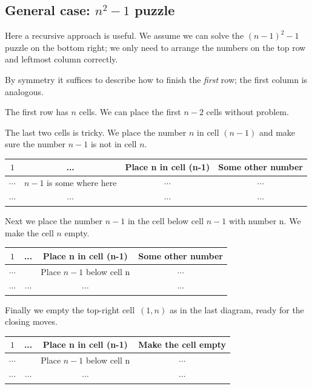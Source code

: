 \subsection{General case: \(n^2-1\) puzzle}
Here a recursive approach is useful. We assume we can
solve the \((n-1)^2-1\) puzzle on the bottom right; we only need
to arrange the numbers on the top row and leftmost column correctly.

By symmetry it suffices to describe how to finish the \emph{first} row; the
first column is analogous.

The first row has \(n\) cells. We can place the first \(n-2\) cells without 
problem. 

The last two cells is tricky. We place the number \(n\) in cell \((n-1)\) 
and make sure the number \(n-1\) is not in cell \(n\). 

\begin{center}
    \small
    \setlength{\tabcolsep}{5pt}
    \renewcommand{\arraystretch}{1.15}
    \begin{tabular}{|c|c|c|c|}
    \hline
    \(1\) & ... & Place n in cell (n-1) & Some other number \\
    \hline
    \(\cdots\) & \(n-1\) is some where here & \(\cdots\) & \(\cdots\) \\
    \hline
    \(\cdots\) & \(\cdots\) & \(\cdots\) & \(\cdots\) \\
    \hline
    \end{tabular}
\end{center}

Next we place the number \(n-1\) in the cell below cell \(n-1\) with number n.
We make the cell \(n\) empty. 
\begin{center}
    \small
    \setlength{\tabcolsep}{5pt}
    \renewcommand{\arraystretch}{1.15}
    \begin{tabular}{|c|c|c|c|}
    \hline
    \(1\) & ... & Place n in cell (n-1) & Some other number \\
    \hline
    \(\cdots\) & & Place \(n-1\) below cell n & \(\cdots\) \\
    \hline
    \(\cdots\) & \(\cdots\) & \(\cdots\) & \(\cdots\) \\
    \hline
    \end{tabular}
\end{center}

Finally we empty the top-right cell~\((1,n)\) as in the last diagram, ready for
the closing moves.
\begin{center}
    \small
    \setlength{\tabcolsep}{5pt}
    \renewcommand{\arraystretch}{1.15}
    \begin{tabular}{|c|c|c|c|}
    \hline
    \(1\) & ... & Place n in cell (n-1) & Make the cell empty \\
    \hline
    \(\cdots\) & & Place \(n-1\) below cell n & \(\cdots\) \\
    \hline
    \(\cdots\) & \(\cdots\) & \(\cdots\) & \(\cdots\) \\
    \hline
    \end{tabular}
\end{center}

